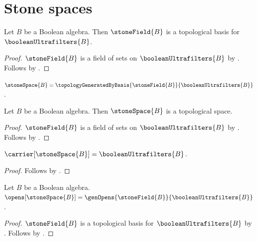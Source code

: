 \section{Stone spaces}









\begin{theorem}\label{stone_field_is_topological_basis}
    Let $B$ be a Boolean algebra.
    Then $\stoneField{B}$ is a topological basis for
        $\booleanUltrafilters{B}$.
\end{theorem}
\begin{proof}
    $\stoneField{B}$ is a field of sets on
        $\booleanUltrafilters{B}$ by
        .
    Follows by .
\end{proof}

\begin{definition}\label{stone_space}
    $\stoneSpace{B}=\topologyGeneratedByBasis
        {\stoneField{B}}{\booleanUltrafilters{B}}$.
\end{definition}

\begin{classification}\label{stone_space_is_topological_space}
    Let $B$ be a Boolean algebra.
    Then $\stoneSpace{B}$ is a topological space.
\end{classification}
\begin{proof}
    $\stoneField{B}$ is a field of sets on
        $\booleanUltrafilters{B}$ by
        .
    Follows by
        .
\end{proof}

\begin{proposition}\label{stone_space_carrier}
    $\carrier[\stoneSpace{B}]=\booleanUltrafilters{B}$.
\end{proposition}
\begin{proof}
    Follows by
        .
\end{proof}

\begin{proposition}\label{stone_space_opens}
    Let $B$ be a Boolean algebra.
    $\opens[\stoneSpace{B}]=
        \genOpens{\stoneField{B}}{\booleanUltrafilters{B}}$.
\end{proposition}
\begin{proof}
    $\stoneField{B}$ is a topological basis for
        $\booleanUltrafilters{B}$ by
        .
    Follows by
        .
\end{proof}


